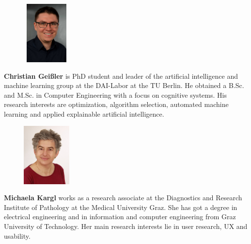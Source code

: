 
 \begin{figure} 
    \includegraphics[width=1in,height=1.25in,clip,keepaspectratio]{bio-images/geissler.jpg}
  \end{figure}\par
  \textbf{ Christian Geißler} is PhD student and leader of the artificial intelligence and machine learning group at the DAI-Labor at the TU Berlin. He obtained a B.Sc. and M.Sc. in Computer Engineering with a focus on cognitive systems. His research interests are optimization, algorithm selection, automated machine learning and applied explainable artificial intelligence.\par


 \begin{figure} 
    \includegraphics[width=1in,height=1.25in,clip,keepaspectratio]{bio-images/kargl.jpg}
  \end{figure}\par
  \textbf{Michaela Kargl} works as a research associate at the Diagnostics and Research Institute of Pathology at the Medical University Graz. She has got a degree in electrical engineering and in  information and computer engineering from Graz University of Technology. Her main research interests lie in user research, UX and usability.\par

